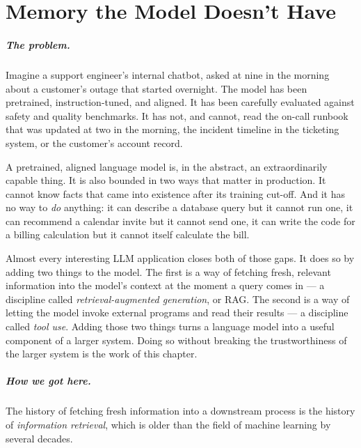 
\chapter{Memory the Model Doesn't Have}
\label{chap:systems}
\label{ntg:ch10}

\scenelabel
\begin{scenestrip}
\end{scenestrip}

\paragraph{The problem.} Imagine a support engineer's internal chatbot, asked at nine in
the morning about a customer's outage that started overnight.
The model has been pretrained, instruction-tuned, and aligned.
It has been carefully evaluated against safety and quality
benchmarks. It has not, and cannot, read the on-call runbook
that was updated at two in the morning, the incident timeline
in the ticketing system, or the customer's account record.

A pretrained, aligned language model is, in the abstract, an
extraordinarily capable thing. It is also bounded in two ways
that matter in production. It cannot know facts that came into
existence after its training cut-off. And it has no way to
\emph{do} anything: it can describe a database query but it
cannot run one, it can recommend a calendar invite but it
cannot send one, it can write the code for a billing
calculation but it cannot itself calculate the bill.

Almost every interesting LLM application closes both of those
gaps. It does so by adding two things to the model. The first
is a way of fetching fresh, relevant information into the
model's context at the moment a query comes in --- a discipline
called \emph{retrieval-augmented generation}, or RAG. The
second is a way of letting the model invoke external programs
and read their results --- a discipline called \emph{tool use}.
Adding those two things turns a language model into a useful
component of a larger system. Doing so without breaking the
trustworthiness of the larger system is the work of this
chapter.

\paragraph{How we got here.} The history of fetching fresh information into a downstream
process is the history of \emph{information retrieval}, which
is older than the field of machine learning by several
decades.

